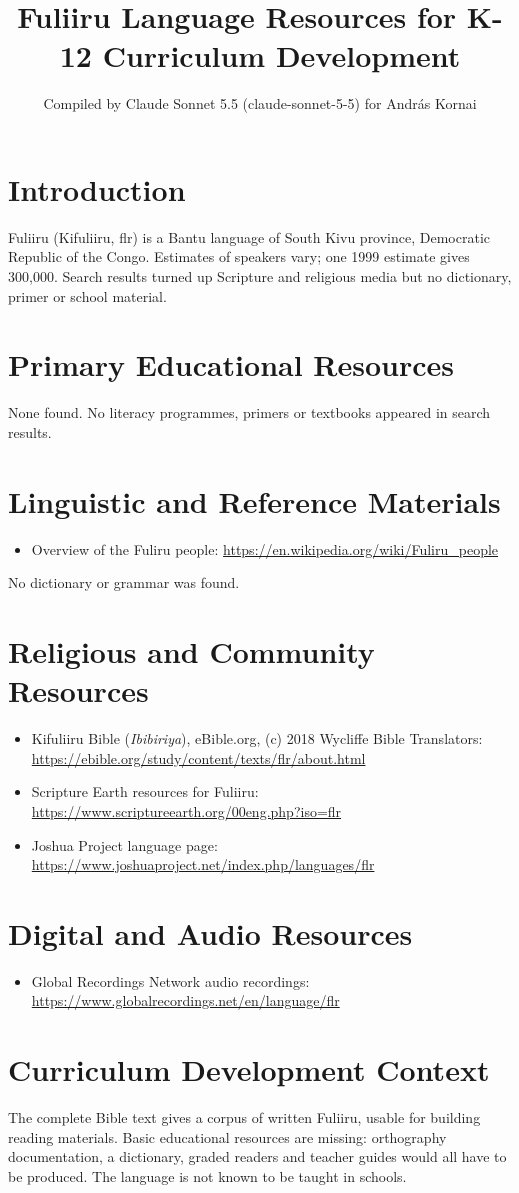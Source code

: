 \documentclass[12pt]{article}
\title{Fuliiru Language Resources for K-12 Curriculum Development}
\author{Compiled by Claude Sonnet 5.5 (claude-sonnet-5-5) for Andr\'as Kornai}
\date{}
\begin{document}
\maketitle

\section{Introduction}
Fuliiru (Kifuliiru, flr) is a Bantu language of South Kivu province, Democratic Republic of the Congo. Estimates of speakers vary; one 1999 estimate gives 300,000. Search results turned up Scripture and religious media but no dictionary, primer or school material.

\section{Primary Educational Resources}
None found. No literacy programmes, primers or textbooks appeared in search results.

\section{Linguistic and Reference Materials}
\begin{itemize}
\item Overview of the Fuliru people: \url{https://en.wikipedia.org/wiki/Fuliru_people}
\end{itemize}
No dictionary or grammar was found.

\section{Religious and Community Resources}
\begin{itemize}
\item Kifuliiru Bible (\emph{Ibibiriya}), eBible.org, (c) 2018 Wycliffe Bible Translators: \url{https://ebible.org/study/content/texts/flr/about.html}
\item Scripture Earth resources for Fuliiru: \url{https://www.scriptureearth.org/00eng.php?iso=flr}
\item Joshua Project language page: \url{https://www.joshuaproject.net/index.php/languages/flr}
\end{itemize}

\section{Digital and Audio Resources}
\begin{itemize}
\item Global Recordings Network audio recordings: \url{https://www.globalrecordings.net/en/language/flr}
\end{itemize}

\section{Curriculum Development Context}
The complete Bible text gives a corpus of written Fuliiru, usable for building reading materials. Basic educational resources are missing: orthography documentation, a dictionary, graded readers and teacher guides would all have to be produced. The language is not known to be taught in schools.
\end{document}
